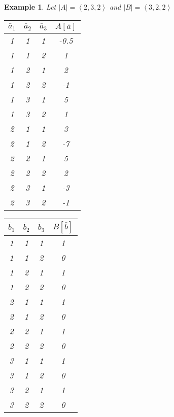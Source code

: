 \documentclass[12pt]{article}
\theoremstyle{definition}
\theoremstyle{plain}
\newtheorem{example}{Example}[section]
\theoremstyle{ppart}
\begin{document}
\newpage
\begin{example}
Let $|A| = \left<2, 3, 2\right>$ and $|B| = \left<3, 2, 2\right>$
\begin{table}[h!]
\begin{center}
\begin{tabular}{c c c | c}
$\bar{a}_1$ & $\bar{a}_2$ & $\bar{a}_3$ & $A[\bar{a}]$ \\
\hline
1           & 1           & 1           & -0.5         \\
1           & 1           & 2           & 1            \\
1           & 2           & 1           & 2            \\
1           & 2           & 2           & -1           \\
1           & 3           & 1           & 5            \\
1           & 3           & 2           & 1            \\
2           & 1           & 1           & 3            \\
2           & 1           & 2           & -7           \\
2           & 2           & 1           & 5            \\
2           & 2           & 2           & 2            \\
2           & 3           & 1           & -3           \\
2           & 3           & 2           & -1
\end{tabular}
\end{center}
\end{table}

\begin{table}[h!]
\begin{center}
\begin{tabular}{c c c | c}
$\bar{b}_1$ & $\bar{b}_2$ & $\bar{b}_3$ & $B[\bar{b}]$ \\
\hline
1           & 1           & 1           & 1            \\
1           & 1           & 2           & 0            \\
1           & 2           & 1           & 1            \\
1           & 2           & 2           & 0            \\
2           & 1           & 1           & 1            \\
2           & 1           & 2           & 0            \\
2           & 2           & 1           & 1            \\
2           & 2           & 2           & 0            \\
3           & 1           & 1           & 1            \\
3           & 1           & 2           & 0            \\
3           & 2           & 1           & 1            \\
3           & 2           & 2           & 0
\end{tabular}
\end{center}
\end{table}


\end{example}
\end{document}
